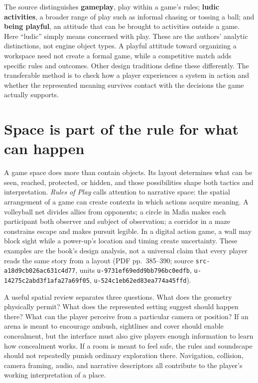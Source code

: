 The source distinguishes \textbf{gameplay}, play within a game's rules; \textbf{ludic activities}, a broader range of play such as informal chasing or tossing a ball; and \textbf{being playful}, an attitude that can be brought to activities outside a game. Here ``ludic'' simply means concerned with play. These are the authors' analytic distinctions, not engine object types. A playful attitude toward organizing a workspace need not create a formal game, while a competitive match adds specific rules and outcomes. Other design traditions define these differently. The transferable method is to check how a player experiences a system in action and whether the represented meaning survives contact with the decisions the game actually supports.

\section{Space is part of the rule for what can happen}\label{06-engine-ii-ch047-space-is-part-of-the-rule-for-what-can-happen}

A game space does more than contain objects. Its layout determines what can be seen, reached, protected, or hidden, and those possibilities shape both tactics and interpretation. \emph{Rules of Play} calls attention to narrative space: the spatial arrangement of a game can create contexts in which actions acquire meaning. A volleyball net divides allies from opponents; a circle in Mafia makes each participant both observer and subject of observation; a corridor in a maze constrains escape and makes pursuit legible. In a digital action game, a wall may block sight while a power-up's location and timing create uncertainty. These examples are the book's design analysis, not a universal claim that every player reads the same story from a layout (PDF pp.~385--390; source \texttt{src-a18d9cb026ac631c4d77}, units \texttt{u-9731ef69edd9bb796bc0edfb}, \texttt{u-14275c2abd3f1afa27a69f05}, \texttt{u-524c1eb62ed83ea774a45ffd}).

A useful spatial review separates three questions. What does the geometry physically permit? What does the represented setting suggest should happen there? What can the player perceive from a particular camera or position? If an arena is meant to encourage ambush, sightlines and cover should enable concealment, but the interface must also give players enough information to learn how concealment works. If a room is meant to feel safe, the rules and soundscape should not repeatedly punish ordinary exploration there. Navigation, collision, camera framing, audio, and narrative descriptors all contribute to the player's working interpretation of a place.

